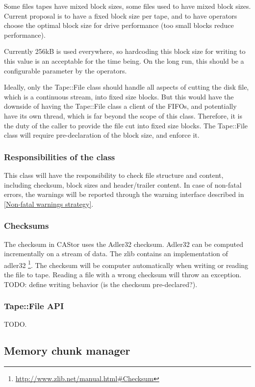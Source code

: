 Some files tapes have mixed block sizes,
some files used to have mixed block sizes. Current proposal is to have a fixed
block size per tape, and to have operators choose the optimal block size for 
drive performance (too small blocks reduce performance). 

Currently 256kB is used everywhere, so hardcoding this block size for writing 
to this value is an acceptable for the time being. On the long run, this should 
be a configurable parameter by the operators.

Ideally, only the Tape::File class should handle all aspects of cutting the disk
file, which is a continuous stream, into fixed size blocks. But this would have the 
downside of having the Tape::File class a client of the FIFOs, and potentially 
have its own thread, which is far beyond the scope of this class. Therefore, it 
is the duty of the caller to provide the file cut into fixed size blocks.
The Tape::File class will require pre-declaration of the block size, and 
enforce it.

\subsubsection{Responsibilities of the class}
This class will have the responsibility to check file structure and content,
including checksum, block sizes and header/trailer content. In case of non-fatal
errors, the warnings will be reported through the warning interface described in
\ref{Non-fatal warnings strategy}.

\subsubsection{Checksums}
The checksum in CAStor uses the Adler32 checksum. Adler32 can be computed 
incrementally on a stream of data. The zlib contains an implementation of adler32
\footnote{\href{http://www.zlib.net/manual.html\#Checksum}{http://www.zlib.net/manual.html\#Checksum}}.
The checksum will be computer automatically when writing or reading the file to
tape. Reading a file with a wrong checksum will throw an exception.
TODO: define writing behavior (is the checksum pre-declared?).

\subsubsection{Tape::File API}
TODO.

\subsection{Memory chunk manager}

